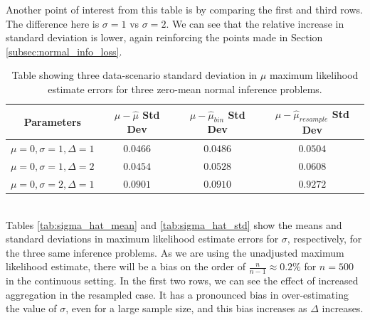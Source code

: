 \documentclass[11pt,a4,twosided,singlespacing,titlepagenumber=on,numbers=endperiod]{scrreprt}
\numberwithin{equation}{chapter} %
\theoremstyle{remark}
\begin{document}
Another point of interest from this table is by comparing the first and third rows. The difference here is $\sigma=1$ vs $\sigma=2$. We can see that the relative increase in standard deviation is lower, again reinforcing the points made in Section \ref{subsec:normal_info_loss}.
\begin{table}[ht]
	\centering
	\begin{tabular}{|c|c|c|c|}
	\hline
	Parameters & $\mu - \hat{\mu}$ Std Dev & $\mu - \hat{\mu}_{bin}$ Std Dev & $\mu - \hat{\mu}_{resample}$ Std Dev \\
	\hline
		$\mu=0, \sigma=1, \Delta=1$ & $0.0466$ & $0.0486$ & $0.0504$ \\
	\hline
		$\mu=0, \sigma=1, \Delta=2$ & $0.0454$ & $0.0528$ & $0.0608$ \\
	\hline
		$\mu=0, \sigma=2, \Delta=1$ & $0.0901$ & $0.0910$ & $0.9272$ \\
	\hline
	\end{tabular}
	\caption{Table showing three data-scenario standard deviation in $\mu$ maximum likelihood estimate errors for three zero-mean normal inference problems.}
	\label{tab:mu_hat_std}
\end{table}\\\noindent
Tables \ref{tab:sigma_hat_mean} and \ref{tab:sigma_hat_std} show the means and standard deviations in maximum likelihood estimate errors for $\sigma$, respectively, for the three same inference problems. As we are using the unadjusted maximum likelihood estimate, there will be a bias on the order of $\frac{n}{n-1} \approx 0.2\%$ for $n=500$ in the continuous setting. In the first two rows, we can see the effect of increased aggregation in the resampled case. It has a pronounced bias in over-estimating the value of $\sigma$, even for a large sample size, and this bias increases as $\Delta$ increases.
\end{document}
